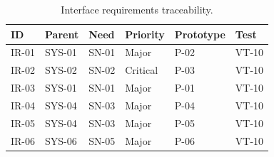 \begin{table}[H]
\centering
\caption{Interface requirements traceability.}
\label{tab:app-trace-interface}
\scriptsize
\begin{tabular}{l l l l l l}
\hline
\textbf{ID} & \textbf{Parent} & \textbf{Need} & \textbf{Priority} & \textbf{Prototype} & \textbf{Test} \\
\hline
IR-01 & SYS-01 & SN-01 & Major & P-02 & VT-10 \\
IR-02 & SYS-02 & SN-02 & Critical & P-03 & VT-10 \\
IR-03 & SYS-01 & SN-01 & Major & P-01 & VT-10 \\
IR-04 & SYS-04 & SN-03 & Major & P-04 & VT-10 \\
IR-05 & SYS-04 & SN-03 & Major & P-05 & VT-10 \\
IR-06 & SYS-06 & SN-05 & Major & P-06 & VT-10 \\
\hline
\end{tabular}
\end{table}


